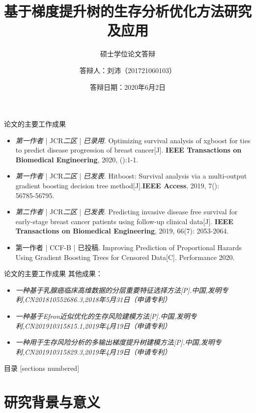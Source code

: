 \documentclass[10pt]{beamer}
\title{基于梯度提升树的生存分析优化方法研究及应用}
\subtitle{硕士学位论文答辩}
\date{答辩日期：2020年6月2日}
\author{答辩人：刘沛（201721060103）}
\institute{电子科技大学计算机科学与工程学院}
\begin{document}
\maketitle

\begin{frame}{论文的主要工作成果}
  \begin{itemize}
  	\item \textit{第一作者} | JCR\textit{二区} | \textit{已录用}. Optimizing survival analysis of xgboost for ties to predict disease progression of breast cancer[J]. \textbf{IEEE Transactions on Biomedical Engineering}, 2020, ():1-1.
    \item \textit{第一作者} | JCR\textit{二区} | \textit{已发表}. Hitboost: Survival analysis via a multi­-output gradient boosting decision tree method[J].\textbf{IEEE Access}, 2019, 7(): 56785­-56795.
    \item \textit{第二作者} | JCR\textit{二区} | \textit{已发表}. Predicting invasive disease­ free survival for early-stage breast cancer patients using follow­-up clinical data[J]. \textbf{IEEE Transactions on Biomedical Engineering}, 2019, 66(7): 2053­-2064.
    \item 第一作者 | CCF-B | 已投稿. Improving Prediction of Proportional Hazards Using Gradient Boosting Trees for Censored Data[C]. Performance 2020.
  \end{itemize}
\end{frame}

\begin{frame}{论文的主要工作成果}
  其他成果：
  \begin{itemize}
    \item \textit{一种基于乳腺癌临床高维数据的分层重要特征选择方法[P].中国,发明专利,CN201810552686.3,2018年5月31日（申请专利）}
    \item \textit{一种基于Efron近似优化的生存风险建模方法[P].中国,发明专利,CN201910315815.1,2019年4月19日（申请专利）}
    \item \textit{一种用于生存风险分析的多输出梯度提升树建模方法[P].中国,发明专利,CN201910315829.3,2019年4月19日（申请专利）}
  \end{itemize}
\end{frame}

\begin{frame}{目录}
  [sections numbered]
  \tableofcontents[hideallsubsections]
\end{frame}

\section{研究背景与意义}
\end{document}
